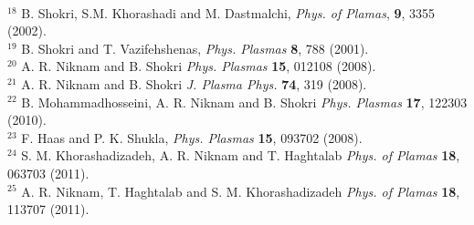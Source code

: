 \begin{thebibliography}{9}
\\
$^{18}$ B. Shokri, S.M. Khorashadi and M. Dastmalchi, {\it Phys. of
Plamas}, {\bf 9}, 3355 (2002).
\\
$^{19}$ B. Shokri and T. Vazifehshenas, {\it Phys. Plasmas} {\bf 8},
788 (2001).
\\
$^{20}$ A. R. Niknam and B. Shokri {\it Phys. Plasmas} {\bf 15},
012108 (2008).
\\
$^{21}$ A. R. Niknam and B. Shokri {\it J. Plasma Phys.} {\bf 74},
319 (2008).
\\
$^{22}$ B. Mohammadhosseini, A. R. Niknam and B. Shokri {\it Phys. Plasmas} {\bf 17}, 122303
(2010).
\\
$^{23}$ F. Haas and P. K. Shukla, {\it Phys. Plasmas} {\bf 15},
093702 (2008).
\\
$^{24}$ S. M. Khorashadizadeh, A. R. Niknam and T. Haghtalab {\it Phys. of Plamas} {\bf 18}, 063703 (2011).
\\
$^{25}$ A. R. Niknam, T. Haghtalab and S. M. Khorashadizadeh {\it Phys. of Plamas} {\bf 18}, 113707 (2011).

\end{thebibliography}


